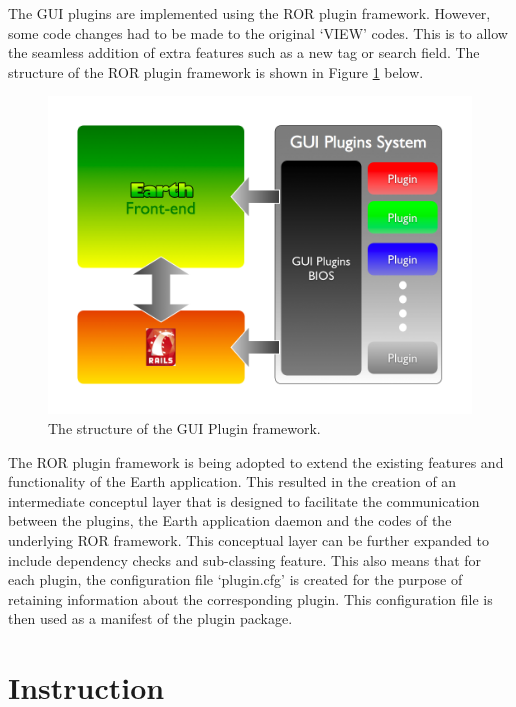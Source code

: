 \documentclass{article}
\begin{document}
The GUI plugins are implemented using the ROR plugin framework. However, some code changes had to be made to the original `VIEW' codes. This is to allow the seamless addition of extra features such as a new tag or search field. The structure of the ROR plugin framework is shown in Figure \ref{fig:flow} below.

\begin{figure}[h!]
\begin{centering}
\includegraphics[width=150mm]{fig/flow}
\end{centering}
\caption{The structure of the GUI Plugin framework.}
\label{fig:flow}
\end{figure}

The ROR plugin framework is being adopted to extend the existing features and functionality of the Earth application. This resulted in the creation of an intermediate conceptul layer that is designed to facilitate the communication between the plugins, the Earth application daemon and the codes of the underlying ROR framework. This conceptual layer can be further expanded to include dependency checks and sub-classing feature. This also means that for each plugin, the configuration file `plugin.cfg' is created for the purpose of retaining information about the corresponding plugin. This configuration file is then used as a manifest of the plugin package.


\section{Instruction} %
\end{document}
